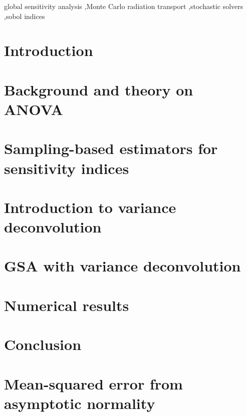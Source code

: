 \documentclass[final,3p,times,dvipsnames]{elsarticle}
\begin{document}
\begin{frontmatter}
\begin{keyword}
global sensitivity analysis \sep Monte Carlo radiation transport \sep stochastic solvers \sep sobol indices



\end{keyword}

\end{frontmatter}

\section{Introduction}
\label{sec:intro}


\section{Background and theory on ANOVA}
\label{sec:anova}


\section{Sampling-based estimators for sensitivity indices}
\label{sec:sampling}


\section{Introduction to variance deconvolution}
\label{sec:deconvolution}


\section{GSA with variance deconvolution}
\label{sec:gsa-deconvolution}


\section{Numerical results}
\label{sec:results}


\section{Conclusion}
\label{sec:conclusion}


\appendix
\section{Mean-squared error from asymptotic normality}
\label{appx:mse}




\end{document}
